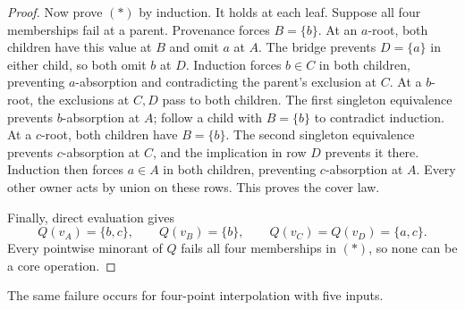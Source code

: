\begin{proof}
Now prove $(*)$ by induction. It holds at each leaf. Suppose all four
memberships fail at a parent. Provenance forces $B=\{b\}$.
At an $a$-root, both children have this value at $B$ and omit $a$ at
$A$. The bridge prevents $D=\{a\}$ in either child, so both omit $b$
at $D$. Induction forces $b\in C$ in both children, preventing
$a$-absorption and contradicting the parent's exclusion at $C$.
At a $b$-root, the exclusions at $C,D$ pass to both children.
The first singleton equivalence prevents $b$-absorption at $A$;
follow a child with $B=\{b\}$ to contradict induction.
At a $c$-root, both children have $B=\{b\}$. The second singleton
equivalence prevents $c$-absorption at $C$, and the implication in
row $D$ prevents it there. Induction then forces $a\in A$ in both
children, preventing $c$-absorption at $A$. Every other owner acts
by union on these rows. This proves the cover law.

Finally, direct evaluation gives
\[
 Q(v_A)=\{b,c\},\qquad Q(v_B)=\{b\},\qquad
 Q(v_C)=Q(v_D)=\{a,c\}.
\]
Every pointwise minorant of $Q$ fails all four memberships in $(*)$,
so none can be a core operation.
\end{proof}


The same failure occurs for four-point interpolation with five inputs.


